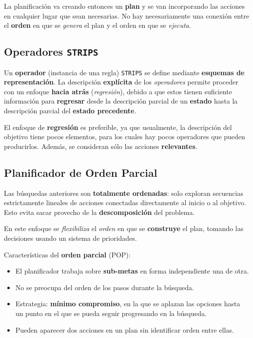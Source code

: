 \documentclass[10pt,a4paper]{article}
\begin{document}
La planificación va creando entonces un \textbf{plan} y se van incorporando las acciones en cualquier lugar que sean necesarias. No hay necesariamente una conexión entre el \textbf{orden} en que se \textit{genera} el plan y el orden en que se \textit{ejecuta}.

\subsection{Operadores \texttt{STRIPS}}

Un \textbf{operador} (instancia de una regla) \texttt{STRIPS} se define mediante \textbf{esquemas de representación}. La descripción \textbf{explícita} de los \textit{operadores} permite proceder con un enfoque \textbf{hacia atrás} (\textit{regresión}), debido a que estos tienen suficiente información para \textbf{regresar} desde la descripción parcial de un \textbf{estado} hasta la descripción parcial del \textbf{estado precedente}.

El enfoque de \textbf{regresión} es preferible, ya que usualmente, la descripción del objetivo tiene pocos elementos, para los cuales hay pocos operadores que pueden producirlos. Además, se consideran sólo las acciones \textbf{relevantes}.

\subsection{Planificador de Orden Parcial}

Las búsquedas anteriores son \textbf{totalmente ordenadas}: solo exploran secuencias estrictamente lineales de acciones conectadas directamente al inicio o al objetivo. Esto evita sacar provecho de la \textbf{descomposición} del problema.

En este enfoque se \textit{flexibiliza} el \textit{orden} en que se \textbf{construye} el plan, tomando las decisiones usando un sistema de prioridades.

Características del \textbf{orden parcial} (POP):
\begin{itemize}
\item El planificador trabaja sobre \textbf{sub-metas} en forma independiente una de otra.
\item No se preocupa del orden de los pasos durante la búsqueda.
\item Estrategia: \textbf{mínimo compromiso}, en la que se aplazan las opciones hasta un punto en el que se pueda seguir progresando en la búsqueda.
\item Pueden aparecer dos acciones en un plan sin identificar orden entre ellas.
\end{itemize}
\end{document}
